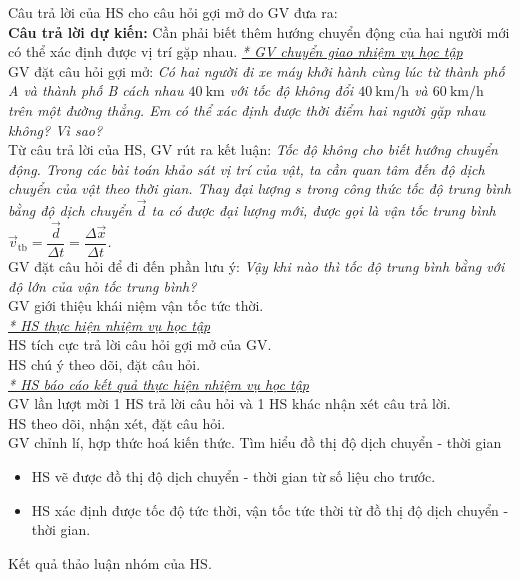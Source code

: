 {
	Câu trả lời của HS cho câu hỏi gợi mở do GV đưa ra:\\
	\textbf{Câu trả lời dự kiến:} Cần phải biết thêm hướng chuyển động của hai người mới có thể xác định được vị trí gặp nhau.
}
{\textit{\underline{* GV chuyển giao nhiệm vụ học tập}}\\
	GV đặt câu hỏi gợi mở: \textit{Có hai người đi xe máy khởi hành cùng lúc từ thành phố A và thành phố B cách nhau $\SI{40}{\kilo\meter}$ với tốc độ không đổi $\SI{40}{\kilo\meter/\hour}$ và $\SI{60}{\kilo\meter/\hour}$ trên một đường thẳng. Em có thể xác định được thời điểm hai người gặp nhau không? Vì sao?}\\
	Từ câu trả lời của HS, GV rút ra kết luận: \textit{Tốc độ không cho biết hướng chuyển động. Trong các bài toán khảo sát vị trí của vật, ta cần quan tâm đến độ dịch chuyển của vật theo thời gian. Thay đại lượng $s$ trong công thức tốc độ trung bình bằng độ dịch chuyển $\vec{d}$ ta có được đại lượng mới, được gọi là vận tốc trung bình $\vec{v}_{\text{tb}}=\dfrac{\vec{d}}{\Delta t}=\dfrac{\Delta \vec{x}}{\Delta t}$.}\\
	GV đặt câu hỏi để đi đến phần lưu ý: \textit{Vậy khi nào thì tốc độ trung bình bằng với độ lớn của vận tốc trung bình?}\\
	GV giới thiệu khái niệm vận tốc tức thời.\\
	\textit{\underline{* HS thực hiện nhiệm vụ học tập}}\\
	HS tích cực trả lời câu hỏi gợi mở của GV.\\
	HS chú ý theo dõi, đặt câu hỏi.\\
	\textit{\underline{* HS báo cáo kết quả thực hiện nhiệm vụ học tập}}\\
	GV lần lượt mời 1 HS trả lời câu hỏi và 1 HS khác nhận xét câu trả lời.\\
	HS theo dõi, nhận xét, đặt câu hỏi.\\
	GV chỉnh lí, hợp thức hoá kiến thức.
}
\hoatdong
{
	Tìm hiểu đồ thị độ dịch chuyển - thời gian
}
{\begin{itemize}
		\item HS vẽ được đồ thị độ dịch chuyển - thời gian từ số liệu cho trước.
		\item HS xác định được tốc độ tức thời, vận tốc tức thời từ đồ thị độ dịch chuyển - thời gian.
	\end{itemize}
	
}
{
	Kết quả thảo luận nhóm của HS.
}
